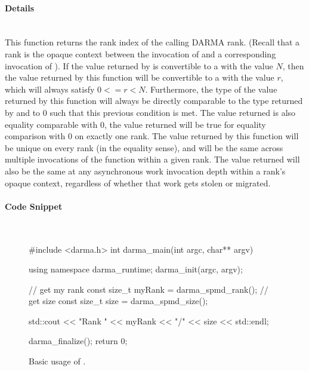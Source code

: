 \paragraph{Details}\mbox{}\\
This function returns the rank index of the calling DARMA \gls{rank}.  (Recall that a
rank is the \gls{opaque context} between the invocation of  and
a corresponding invocation of ).  If the value returned
by  is convertible to a  with the
value $N$, then the value returned by this function will be convertible to a
 with the value $r$, which will always satisfy $0 <=
r < N$.  Furthermore, the type of the value returned by this function will
always be directly comparable to the type returned by 
and to $0$ such that this previous condition is met.  The value returned is also
equality comparable with $0$, the value returned will be true for equality
comparison with $0$ on exactly one rank.  The value returned by this function
will be unique on every \gls{rank} (in the equality sense), and will be the same
across multiple invocations of the function within a given \gls{rank}.  The value
returned will also be the same at any asynchronous work invocation depth within
a rank's \gls{opaque context}, regardless of whether that work gets stolen or
migrated.

\paragraph{Code Snippet}\mbox{}\\ 
\begin{figure}[!h]
\begin{CppCodeNumb}
#include <darma.h>
int darma_main(int argc, char** argv)
{
  using namespace darma_runtime;
  darma_init(argc, argv);

  // get my rank
  const size_t myRank = darma_spmd_rank();
  // get size 
  const size_t size = darma_spmd_size();

  std::cout << "Rank " << myRank << "/" << size << std::endl;

  darma_finalize();
  return 0;
}
\end{CppCodeNumb}
\label{fig:fe_api_ranksize}
\caption{Basic usage of \protect{}.}
\end{figure}


